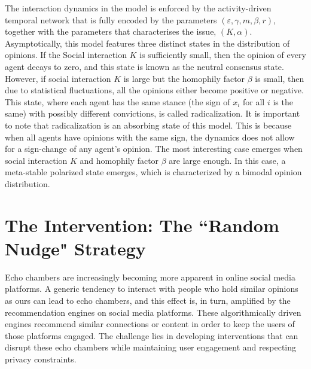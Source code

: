 The interaction dynamics in the model is enforced by the activity-driven temporal network that is fully encoded 
by the parameters $(\varepsilon, \gamma, m, \beta, r)$, together with the parameters that characterises the issue, $(K, \alpha)$. Asymptotically, this model features three distinct states in the distribution of opinions. If the Social interaction $K$ is sufficiently small, then the opinion of every agent decays to zero, and this state is known as the neutral consensus state. However, if social interaction $K$ is large but the homophily factor $\beta$ is small, then due to statistical fluctuations, all the opinions either become positive or negative. This state, where each agent has the same stance (the sign of $x_i$ for all $i$ is the same) with possibly different convictions, is called radicalization. It is important to note that radicalization is an absorbing state of this model. This is because when all agents have opinions with the same sign, the dynamics does not allow for a sign-change of any agent's opinion. The most interesting case emerges when social interaction $K$ and homophily factor $\beta$ are large enough. In this case, a meta-stable polarized state emerges, which is characterized by a bimodal opinion distribution.

\section{The Intervention: The ``Random Nudge" Strategy}
\label{sec:random_nudge}

Echo chambers are increasingly becoming more apparent in online social media platforms. A generic tendency to interact with people who hold similar opinions as ours can lead to echo chambers, and this effect is, in turn, amplified by the recommendation engines on social media platforms. These algorithmically driven engines recommend similar connections or content in order to keep the users of those platforms engaged. The challenge lies in developing interventions that can disrupt these echo chambers while maintaining user engagement and respecting privacy constraints.

